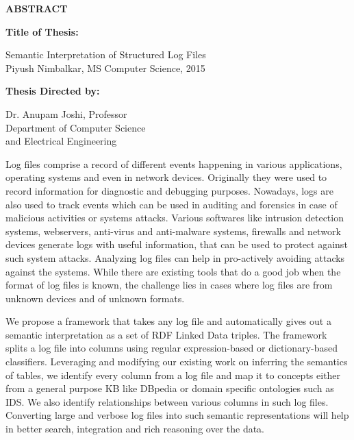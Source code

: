 \newpage
\pagestyle{empty}

\begin{center}
\large{\bf ABSTRACT} \par 
\end{center}

{\bf Title of Thesis:} \parbox[t]{4.5in}{{Semantic Interpretation of Structured Log Files\\
Piyush Nimbalkar, MS Computer Science, 2015}}
\begin{singlespace}
{\bf Thesis Directed by:}{\hspace{2.5mm}} \parbox[t]{3in}{Dr. Anupam Joshi, Professor\\
Department of Computer Science\\ 
and Electrical Engineering\\}
\end{singlespace}

Log files comprise a record of different events happening in various applications, operating systems and even in network devices. Originally they were used to record information for diagnostic and debugging purposes. Nowadays, logs are also used to track events which can be used in auditing and forensics in case of malicious activities or systems attacks. Various softwares like intrusion detection systems, webservers, anti-virus and anti-malware systems, firewalls and network devices generate logs with useful information, that can be used to protect against such system attacks. Analyzing log files can help in pro-actively avoiding attacks against the systems. While there are existing tools that do a good job when the format of log files is known, the challenge lies in cases where log files are from unknown devices and of unknown formats.

We propose a framework that takes any log file and automatically gives out a semantic interpretation as a set of RDF Linked Data triples. The framework splits a log file into columns using regular expression-based or dictionary-based classifiers. Leveraging and modifying our existing work on inferring the semantics of tables, we identify every column from a log file and map it to concepts either from a general purpose KB like DBpedia or domain specific ontologies such as IDS. We also identify relationships between various columns in such log files. Converting large and verbose log files into such semantic representations will help in better search, integration and rich reasoning over the data.

\par\vfil

